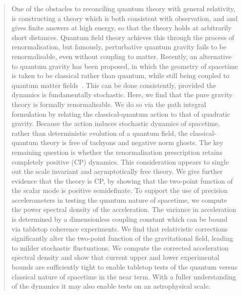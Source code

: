 \documentclass[aps,preprintnumbers,superscriptaddress,longbibliography]{revtex4-1}
\begin{document}
\begin{abstract}
One of the obstacles to reconciling quantum theory with general relativity, is constructing a theory which is both consistent with observation, and and gives finite answers at high energy, so that the theory holds at arbitrarily short distances. Quantum field theory achieves this through the process of renormalisation, but famously, perturbative quantum gravity fails to be renormalisable, even without coupling to matter.  
Recently, an alternative to quantum gravity has been proposed, in which the geometry of spacetime is taken to be classical rather than quantum, while still being coupled to quantum matter fields~\cite{oppenheim2018post,oppenheim2023covariant}. 
This can be done consistently, provided the dynamics is fundamentally stochastic. Here, we find that the pure gravity theory is formally renormalisable. We do so via the path integral formulation by relating the classical-quantum action to that of quadratic gravity. Because the action induces stochastic dynamics of spacetime, rather than deterministic evolution of a quantum field, the classical-quantum theory is free of tachyons and negative norm ghosts. The key remaining question is whether the renormalisation prescription retains completely positive (CP) dynamics. This consideration appears to single out
the scale invariant and asymptotically free theory. We give further evidence that the theory is CP, by showing that the two-point function of the scalar mode is positive semidefinate.  To support the use of precision accelerometers in testing the quantum nature of spacetime, we compute the power spectral density of the acceleration. The variance in acceleration is determined by a dimensionless coupling constant which can be bound via tabletop coherence experiments. We find that relativistic corrections significantly alter the two-point function of the gravitational field, leading to milder stochastic fluctuations. We compute the corrected acceleration spectral density and show that current upper and lower experimental bounds are sufficiently tight to enable tabletop tests of the quantum versus classical nature of spacetime in the near term. With a fuller understanding of the dynamics it may also enable tests on an astrophysical scale. 
\end{abstract}
\end{document}
